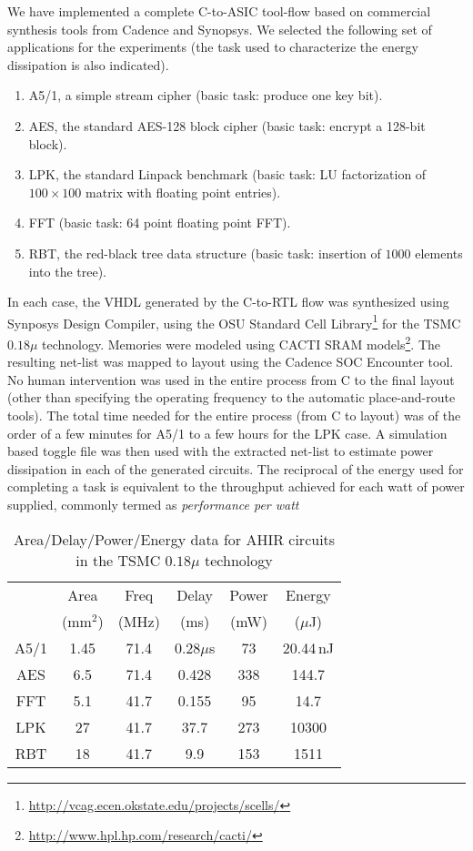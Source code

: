\documentclass[conference]{IEEEtran}
\begin{document}
We have implemented a complete C-to-ASIC tool-flow based on commercial
synthesis tools from Cadence and Synopsys.  We selected the
following set of applications for the experiments (the task used
to characterize the energy dissipation is also indicated).
\begin{enumerate}
\item A5/1, a simple stream cipher (basic task: produce one key bit).
\item AES, the standard AES-128 block cipher (basic task: encrypt a 128-bit block).
\item LPK, the standard Linpack benchmark (basic task: LU factorization of $100\times100$ matrix with
floating point entries).
\item FFT (basic task: 64 point floating point FFT).
\item RBT, the red-black tree data structure (basic task: insertion of $1000$ elements into
the tree).
\end{enumerate}

In each case, the VHDL generated by the C-to-RTL flow was synthesized
using Synposys Design Compiler, using the OSU Standard Cell
Library\footnote{\url{http://vcag.ecen.okstate.edu/projects/scells/}}
for the TSMC $0.18\mu$ technology. Memories were modeled using CACTI
SRAM
models\cite{CACTI}\footnote{\url{http://www.hpl.hp.com/research/cacti/}}.
The resulting net-list was mapped to layout using the Cadence SOC
Encounter tool. No human intervention was used in the entire process
from C to the final layout (other than specifying the operating
frequency to the automatic place-and-route tools). The total time
needed for the entire process (from C to layout) was of the order of a
few minutes for A5/1 to a few hours for the LPK case. A simulation
based toggle file was then used with the extracted net-list to
estimate power dissipation in each of the generated circuits. The
reciprocal of the energy used for completing a task is equivalent to
the throughput achieved for each watt of power supplied, commonly
termed as {\em performance per watt}

\begin{table}[htb]
  \centering
  \caption{Area/Delay/Power/Energy data for AHIR circuits in the TSMC $0.18\mu$ technology}
  \label{table:tsmc-180nm-data}
  \renewcommand\arraystretch{1.2}
  \setlength{\tabcolsep}{1ex}
  \begin{tabular}{c|c|c|c|c|c}
    \hline
    & Area & Freq & Delay & Power & Energy \\
    & (mm$^2$) & (MHz) & (ms) & (mW) & ($\mu$J) \\
    \hline
    \hline
    A5/1 & 1.45 & 71.4 & 0.28$\mu$s & 73 & 20.44\,nJ \\
    \hline
    AES & 6.5 & 71.4 & 0.428 & 338 & 144.7 \\
    \hline
    FFT & 5.1 & 41.7 & 0.155  & 95 & 14.7  \\
    \hline
    LPK & 27 & 41.7 & 37.7 & 273 & 10300  \\
    \hline
    RBT & 18 & 41.7 & 9.9 & 153 & 1511 \\
    \hline
  \end{tabular}

\end{table}
\end{document}
